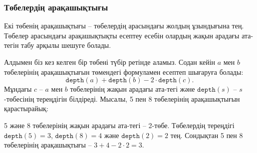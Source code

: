 \subsubsection{Төбелердің арақашықтығы}

Екі төбенің арақашықтығы -- төбелердің арасындағы жолдың
ұзындығына тең. 
Төбелер арасындағы арақашықтықты есептеу есебін 
олардың жақын арадағы ата-тегін табу арқылы шешуге болады.

Алдымен біз кез келген бір төбені түбір ретінде 
аламыз. Содан кейін $a$ мен $b$ төбелерінің
арақашықтығын төмендегі формуламен есептеп шығаруға болады: 
\[\texttt{depth}(a)+\texttt{depth}(b)-2 \cdot \texttt{depth}(c).\]
Мұндағы $c$ -- $a$ мен $b$ төбелерінің жақын арадағы ата-тегі және $\texttt{depth}(s)$ -- $s$-төбесінің тереңдігін білдіреді.
Мысалы, 5 пен 8 төбелерінің арақашықтығын қарастырайық:
\begin{center}
\end{center}

5 және 8 төбелерінің жақын арадағы ата-тегі -- 2-төбе.
Төбелердің тереңдігі $\texttt{depth}(5)=3$,
$\texttt{depth}(8)=4$ және $\texttt{depth}(2)=2$ тең.
Сондықтан 5 пен 8 төбелерінің арақашықтығы -- $3+4-2\cdot2=3$.

